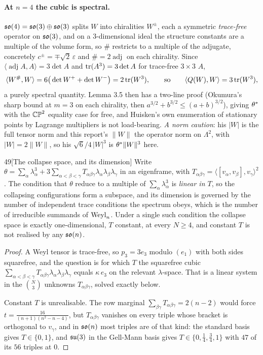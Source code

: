 \paragraph{At $n=4$ the cubic is spectral.} $\mathfrak{so}(4)=\mathfrak{so}(3)\oplus\mathfrak{so}(3)$ splits $W$ into chiralities $W^{\pm}$, each a symmetric \emph{trace-free} operator on $\mathfrak{so}(3)$, and on a $3$-dimensional ideal the structure constants are a multiple of the volume form, so $\#$ restricts to a multiple of the adjugate, concretely $c^{\pm}=\mp\sqrt2\,\varepsilon$ and $\#=2\operatorname{adj}$ on each chirality. Since $\langle\operatorname{adj}A,A\rangle=3\det A$ and $\operatorname{tr}(A^3)=3\det A$ for trace-free $3\times3$ $A$,
\[
\langle W^{\#},W\rangle=6\big(\det W^{+}+\det W^{-}\big)=2\operatorname{tr}(W^3),\qquad\text{so}\qquad \langle Q(W),W\rangle=3\operatorname{tr}(W^3),
\]
a purely spectral quantity. Lemma 3.5 then has a two-line proof (Okumura's sharp bound at $m=3$ on each chirality, then $a^{3/2}+b^{3/2}\le(a+b)^{3/2}$), giving $\theta^{*}$ with the $\mathbb{CP}^2$ equality case for free, and Huisken's own enumeration of stationary points by Lagrange multipliers is not load-bearing. \emph{A norm caution}: his $|W|$ is the full tensor norm and this report's $\|W\|$ the operator norm on $\Lambda^2$, with $|W|=2\|W\|$, so his $\sqrt6/4\,|W|^3$ is $\theta^{*}\|W\|^3$ here.

\begin{Lem}{49}[The collapse space, and its dimension]
Write $\theta=\sum_\alpha\lambda_\alpha^3+3\sum_{\alpha<\beta<\gamma}T_{\alpha\beta\gamma}\lambda_\alpha\lambda_\beta\lambda_\gamma$ in an eigenframe, with $T_{\alpha\beta\gamma}=\langle[v_\alpha,v_\beta],v_\gamma\rangle^2$. The condition that $\theta$ reduce to a multiple of $\sum_\alpha\lambda_\alpha^3$ is \emph{linear in $T$}, so the collapsing configurations form a subspace, and its dimension is governed by the number of independent trace conditions the spectrum obeys, which is the number of irreducible summands of $\mathrm{Weyl}_n$. Under a single such condition the collapse space is exactly one-dimensional, $T$ constant, at every $N\ge4$, and constant $T$ is not realised by any $\mathfrak{so}(n)$.
\end{Lem}

\begin{proof}
A Weyl tensor is trace-free, so $p_3=3e_3$ modulo $(e_1)$ with both sides squarefree, and the question is for which $T$ the squarefree cubic $\sum_{\alpha<\beta<\gamma}T_{\alpha\beta\gamma}\lambda_\alpha\lambda_\beta\lambda_\gamma$ equals $\kappa\,e_3$ on the relevant $\lambda$-space. That is a linear system in the $\binom N3$ unknowns $T_{\alpha\beta\gamma}$, solved exactly below.

Constant $T$ is unrealisable. The row marginal $\sum_{\beta\gamma}T_{\alpha\beta\gamma}=2(n-2)$ would force $t=\tfrac{16}{(n+1)(n^2-n-4)}$, but $T_{\alpha\beta\gamma}$ vanishes on every triple whose bracket is orthogonal to $v_\gamma$, and in $\mathfrak{so}(n)$ most triples are of that kind: the standard basis gives $T\in\{0,1\}$, and $\mathfrak{su}(3)$ in the Gell-Mann basis gives $T\in\{0,\tfrac14,\tfrac34,1\}$ with $47$ of its $56$ triples at $0$.
\end{proof}


